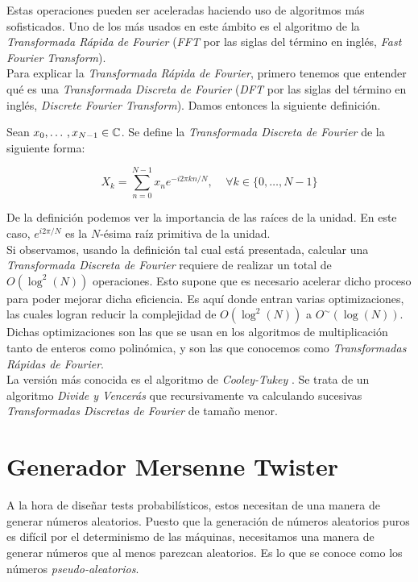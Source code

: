Estas operaciones pueden ser aceleradas haciendo uso de algoritmos más sofisticados. Uno de los más usados en este ámbito es el algoritmo de la \textit{Transformada Rápida de Fourier} (\textit{FFT} por las siglas del término en inglés, \textit{Fast Fourier Transform}).\\

Para explicar la \textit{Transformada Rápida de Fourier}, primero tenemos que entender qué es una \textit{Transformada Discreta de Fourier} (\textit{DFT} por las siglas del término en inglés, \textit{Discrete Fourier Transform}). Damos entonces la siguiente definición.

\begin{definicion}
	Sean $x_0,\dotso,x_{N-1} \in \mathbb{C}$. Se define la \textit{Transformada Discreta de Fourier} de la siguiente forma:
	
	\begin{equation}
	X_k = \sum_{n=0}^{N-1}x_ne^{-i2\pi kn / N},\;\;\;\;\forall k \in \{0,\dotso,N-1\}
	\end{equation}
\end{definicion}

De la definición podemos ver la importancia de las raíces de la unidad. En este caso, $e^{i2\pi/N}$ es la $N$-ésima raíz primitiva de la unidad.\\

Si observamos, usando la definición tal cual está presentada, calcular una \textit{Transformada Discreta de Fourier} requiere de realizar un total de $O(\log^2(N))$ operaciones. Esto supone que es necesario acelerar dicho proceso para poder mejorar dicha eficiencia. Es aquí donde entran varias optimizaciones, las cuales logran reducir la complejidad de $O(\log^2(N))$ a $O^\sim(\log(N))$. Dichas optimizaciones son las que se usan en los algoritmos de multiplicación tanto de enteros como polinómica, y son las que conocemos como \textit{Transformadas Rápidas de Fourier}.\\

La versión más conocida es el algoritmo de \textit{Cooley-Tukey} \cite{cooley_tukey_1969}. Se trata de un algoritmo \textit{Divide y Vencerás} que recursivamente va calculando sucesivas \textit{Transformadas Discretas de Fourier} de tamaño menor.

\section{Generador Mersenne Twister}

A la hora de diseñar tests probabilísticos, estos necesitan de una manera de generar números aleatorios. Puesto que la generación de números aleatorios puros es difícil por el determinismo de las máquinas, necesitamos una manera de generar números que al menos parezcan aleatorios. Es lo que se conoce como los números \textit{pseudo-aleatorios}.\\

